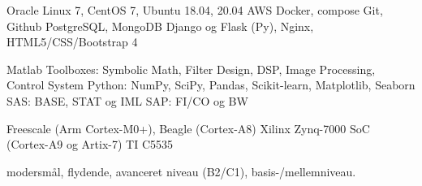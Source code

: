 \documentclass[a4paper]{janus-resume} %
\begin{document}
\begin{minipage}[t]{0.49\textwidth}
Oracle Linux 7, CentOS 7, Ubuntu 18.04, 20.04
\textbullet{} AWS
\textbullet{} Docker, compose
\textbullet{} Git, Github
\textbullet{} PostgreSQL, MongoDB
\textbullet{} Django og Flask (Py), Nginx, HTML5/CSS/Bootstrap 4
\sectionspace %

Matlab Toolboxes: Symbolic Math, Filter Design, DSP, Image Processing, Control System
\textbullet{} Python: NumPy, SciPy, Pandas, Scikit-learn, Matplotlib, Seaborn
\textbullet{} SAS: BASE, STAT og IML
\textbullet{} SAP: FI/CO og BW 
\sectionspace %

Freescale (Arm Cortex-M0+), Beagle (Cortex-A8)
\textbullet{} Xilinx Zynq-7000 SoC (Cortex-A9 og Artix-7)
\textbullet{} TI C5535 \\
\sectionspace %

\sectionspace %


 modersmål,
 flydende,
 avanceret niveau (B2/C1),
 basis-/mellemniveau.

\sectionspace %







\end{minipage} %
\end{document}
